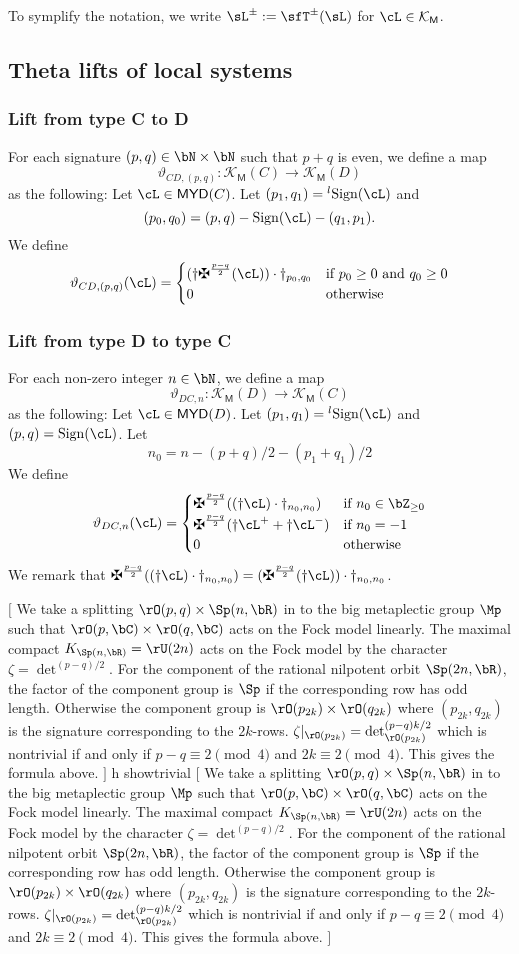 \documentclass[12pt,a4paper]{amsart}
\newcommand{\trivial}[2][]{\if\relax\detokenize{#1}\relax
  {%
      \color{orange} \vspace{0em} $[$  #2 $]$
      \color{black}
  }
  \else
\ifx#1h
\ifcsname showtrivial\endcsname
{%
    \color{orange} \vspace{0em}  $[$ #2 $]$
    \color{black}
}
\fi
\else {\red Wrong argument!} \fi
\fi
}
\def\MYD{{\mathsf{MYD}}}
\def\KM{{\mathcal{K_{\mathsf{M}}}}}
\numberwithin{equation}{section}
\theoremstyle{remark}
\def\lsign{{}^l\mathrm{Sign}}
\def\ssign{\mathrm{Sign}}
\begin{document}
To symplify the notation, we write $\sL^{\pm} := \Tpm(\sL)$ for $\cL\in \KM$.

\subsection{Theta lifts of local systems}


\subsubsection{Lift from type C to D}

For each signature $(p,q)\in \bN\times \bN$ such that $p+q$ is even, we define a map
\[
  \vartheta_{CD,(p,q)} \colon \KM(C)\rightarrow \KM(D)
\]
as the following:
Let $\cL\in \MYD(C)$. Let $(p_{1},q_{1})=\lsign(\cL)$ and
\[
(p_{0}, q_{0})  = (p,q) -\ssign(\cL)-(q_{1},p_{1}).
\]
We define
\[
  \vartheta_{CD,(p,q)}(\cL) =
  \begin{cases}
    (\dagger \maltese^{\frac{p-q}{2}}(\cL))\cdot \dagger_{p_{0}, q_{0}} &
    \text{if } p_{0}\geq 0 \text{ and } q_{0} \geq 0 \\
    0 & \text{otherwise}
  \end{cases}
\]


\subsubsection{Lift from type D to type C}

For each non-zero integer $n\in \bN$, we define a map
\[
  \vartheta_{DC,n} \colon \KM(D)\rightarrow \KM(C)
\]
as the following:
Let $\cL\in \MYD(D)$. Let $(p_{1},q_{1})=\lsign(\cL)$ and
$(p,q) = \ssign(\cL)$.
Let
\[
  n_{0} = n - (p+q)/2 - (p_{1}+q_{1})/2
\]
We define
\[
  \vartheta_{DC,n}(\cL) =
  \begin{cases}
    \maltese^{\frac{p-q}{2}}((\dagger \cL)\cdot \dagger_{n_{0}, n_{0}}) &
    \text{if } n_{0}\in \bZ_{\geq 0}\\
    \maltese^{\frac{p-q}{2}}(\dagger \cL^{+}  + \dagger \cL^{-})& \text{if } n_{0}=-1\\
    0&\text{otherwise}
  \end{cases}
\]
We remark that
$\maltese^{\frac{p-q}{2}}((\dagger \cL)\cdot \dagger_{n_{0}, n_{0}})= (\maltese^{\frac{p-q}{2}}(\dagger\cL))\cdot \dagger_{n_{0},n_{0}}$.

\trivial{
  We take a splitting $\rO(p,q)\times \Sp(n,\bR)$ in to the big metaplectic
  group $\Mp$ such that $\rO(p,\bC)\times\rO(q,\bC)$ acts on the Fock model linearly.
  The maximal compact $K_{\Sp(n,\bR)}= \rU(2n)$ acts on the Fock model by the
  character $\zeta=\det^{(p-q)/2}$.
  For the component of the rational nilpotent orbit $\Sp(2n,\bR)$,
  the factor of the component group is $\Sp$ if the corresponding row has odd
  length.
  Otherwise the component group is $\rO(p_{2k})\times\rO(q_{2k})$ where
  $(p_{2k},q_{2k})$ is the signature corresponding to the $2k$-rows.
  $\zeta|_{\rO(p_{2k})}= \det^{(p-q)k/2}_{\rO(p_{2k})}$ which is nontrivial if
  and only if $p-q\equiv 2\pmod{4}$ and $2k\equiv 2\pmod{4}$.
  This gives the formula above.
}
\end{document}
